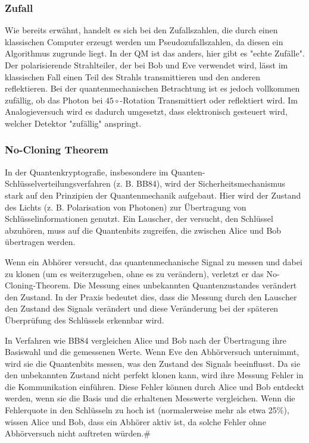 \subsubsection{Zufall}
Wie bereits erwähnt, handelt es sich bei den Zufallszahlen, die durch einen klassischen Computer erzeugt werden um Pseudozufallszahlen, da diesen ein Algorithmus zugrunde liegt. 
In der QM ist das anders, hier gibt es "echte Zufälle". Der polarisierende Strahlteiler, der bei Bob und Eve verwendet wird, lässt im klassischen Fall einen Teil des Strahls transmittieren und den anderen reflektieren.
Bei der quantenmechanischen Betrachtung ist es jedoch vollkommen zufällig, ob das Photon bei $45\circ$-Rotation Transmittiert oder reflektiert wird. Im Analogieversuch wird es dadurch umgesetzt, dass elektronisch gesteuert wird, welcher Detektor "zufällig" anspringt.

\subsubsection{No-Cloning Theorem}
In der Quantenkryptografie, insbesondere im Quanten-Schlüsselverteilungsverfahren (z. B. BB84), wird der Sicherheitsmechanismus stark auf den Prinzipien der Quantenmechanik aufgebaut. Hier wird der Zustand des Lichts (z. B. Polarisation von Photonen) zur Übertragung von Schlüsselinformationen genutzt. Ein Lauscher, der versucht, den Schlüssel abzuhören, muss auf die Quantenbits zugreifen, die zwischen Alice und Bob übertragen werden.

Wenn ein Abhörer versucht, das quantenmechanische Signal zu messen und dabei zu klonen (um es weiterzugeben, ohne es zu verändern), verletzt er das No-Cloning-Theorem. Die Messung eines unbekannten Quantenzustandes verändert den Zustand. In der Praxis bedeutet dies, dass die Messung durch den Lauscher den Zustand des Signals verändert und diese Veränderung bei der späteren Überprüfung des Schlüssels erkennbar wird.

In Verfahren wie BB84 vergleichen Alice und Bob nach der Übertragung ihre Basiswahl und die gemessenen Werte. Wenn Eve den Abhörversuch unternimmt, wird sie die Quantenbits messen, was den Zustand des Signals beeinflusst. Da sie den unbekannten Zustand nicht perfekt klonen kann, wird ihre Messung Fehler in die Kommunikation einführen. Diese Fehler können durch Alice und Bob entdeckt werden, wenn sie die Basis und die erhaltenen Messwerte vergleichen. 
Wenn die Fehlerquote in den Schlüsseln zu hoch ist (normalerweise mehr als etwa 25\%), wissen Alice und Bob, dass ein Abhörer aktiv ist, da solche Fehler ohne Abhörversuch nicht auftreten würden.#

